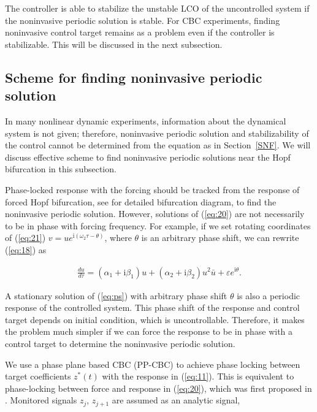 \documentclass[openacc]{rsproca_new}%
\def\epsilon{\varepsilon}
\newcommand{\Eref}[1]{(\ref{#1})}
\newcommand{\Sref}[1]{Section~\ref{#1}}
\begin{document}
\noindent The controller is able to stabilize the unstable LCO of the uncontrolled system if the noninvasive periodic solution is stable. For CBC experiments, finding noninvasive control target remains as a problem even if the controller is stabilizable. This will be discussed in the next subsection.

\subsection{Scheme for finding noninvasive periodic solution}\label{FNP}

In many nonlinear dynamic experiments, information about the dynamical system is not given; therefore, noninvasive periodic solution and stabilizability of the control cannot be determined from the equation as in \Sref{SNF}. We will discuss effective scheme to find noninvasive periodic solutions near the Hopf bifurcation in this subsection.

Phase-locked response with the forcing should be tracked from the response of forced Hopf bifurcation, see \cite{zhang2011periodically,wiser2015bifurcations} for detailed bifurcation diagram, to find the noninvasive periodic solution. However, solutions of \Eref{eq:20} are not necessarily to be in phase with forcing frequency. For example, if we set rotating coordinates of \Eref{eq:21} $v=ue^{\textrm{i}(\omega_2 \tau-\theta)}$, where $\theta$ is an arbitrary phase shift, we can rewrite \Eref{eq:18}
as

\begin{align}\label{eq:ps}
\frac{du}{d\tau}=(\alpha_1+\textrm{i}\beta_1)u+(\alpha_2+\textrm{i}\beta_2)u^2 \bar u+\epsilon e^{\textrm{i}\theta}.
\end{align}

\noindent A stationary solution of \Eref{eq:ps} with arbitrary phase shift $\theta$ is also a periodic response of the controlled system. This phase shift of the response and control target depends on initial condition, which is uncontrollable. Therefore, it makes the problem much simpler if we can force the response to be in phase with a control target to determine the noninvasive periodic solution.

We use a phase plane based CBC (PP-CBC) to achieve phase locking between target coefficients $z^*(t)$ with the response in \Eref{eq:11}. This is equivalent to phase-locking between force and response in \Eref{eq:20}, which was first proposed in \cite{irene}. Monitored signals $z_j$, $z_{j+1}$  are assumed as an analytic signal,
\end{document}
